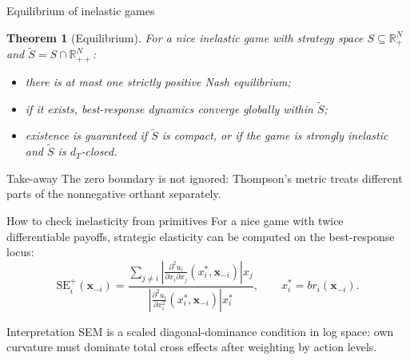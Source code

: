 \documentclass[11pt,aspectratio=169]{beamer}
\theoremstyle{plain}
\newtheorem{mytheorem}{Theorem}
\theoremstyle{definition}
\newenvironment{wideitemize}
  {\begin{itemize}\setlength{\itemsep}{0.72em}}
  {\end{itemize}}
\newcommand{\R}{\mathbb{R}}
\newcommand{\x}{\mathbf{x}}
\newcommand{\0}{\mathbf{0}}
\newcommand{\SE}{\mathrm{SE}}
\begin{document}
\begin{frame}{Equilibrium of inelastic games}
\begin{mytheorem}[Equilibrium]
For a nice inelastic game with strategy space $S\subseteq\R^N_+$ and
$\widetilde S=S\cap\R^N_{++}$:
\begin{wideitemize}
    \item there is at most one strictly positive Nash equilibrium;
    \item if it exists, best-response dynamics converge globally within $\widetilde S$;
    \item existence is guaranteed if $\widetilde S$ is compact, or if the game is strongly inelastic and $\widetilde S$ is $d_T$-closed.
\end{wideitemize}
\end{mytheorem}

\begin{block}{Take-away}
The zero boundary is not ignored: Thompson's metric treats different
parts of the nonnegative orthant separately.
\end{block}
\end{frame}

\begin{frame}{How to check inelasticity from primitives}
\small
For a nice game with twice differentiable payoffs, strategic elasticity can be
computed on the best-response locus:
\[
\SE_i^+(\x_{-i})
=
\frac{
\sum_{j\ne i}
\left|
\frac{\partial^2 u_i}{\partial x_i\partial x_j}
(x_i^*,\x_{-i})
\right|x_j
}{
\left|
\frac{\partial^2 u_i}{\partial x_i^2}
(x_i^*,\x_{-i})
\right|x_i^*
},
\qquad
x_i^*=br_i(\x_{-i}).
\]

\begin{block}{Interpretation}
SEM is a scaled diagonal-dominance condition in log space: own curvature
must dominate total cross effects after weighting by action levels.
\end{block}
\end{frame}
\end{document}
